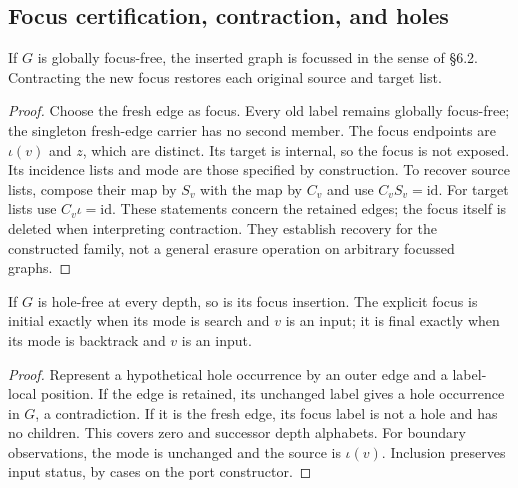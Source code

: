 \subsection{Focus certification, contraction, and holes}
\begin{theorem}
If $G$ is globally focus-free, the inserted graph is focussed in the sense of
\S6.2. Contracting the new focus restores each original source and target list.
\end{theorem}
\begin{proof}
Choose the fresh edge as focus. Every old label remains globally focus-free;
the singleton fresh-edge carrier has no second member. The focus endpoints are
$\iota(v)$ and $z$, which are distinct. Its target is internal, so the focus is
not exposed. Its incidence lists and mode are those specified by construction.
To recover source lists, compose their map by $S_v$ with the map by $C_v$ and
use $C_vS_v=\mathrm{id}$. For target lists use $C_v\iota=\mathrm{id}$.
These statements concern the retained edges; the focus itself is deleted when
interpreting contraction. They establish recovery for the constructed family,
not a general erasure operation on arbitrary focussed graphs.
\end{proof}

\begin{lemma}
If $G$ is hole-free at every depth, so is its focus insertion. The explicit
focus is initial exactly when its mode is search and $v$ is an input; it is
final exactly when its mode is backtrack and $v$ is an input.
\end{lemma}
\begin{proof}
Represent a hypothetical hole occurrence by an outer edge and a label-local
position. If the edge is retained, its unchanged label gives a hole occurrence
in $G$, a contradiction. If it is the fresh edge, its focus label is not a hole
and has no children. This covers zero and successor depth alphabets.
For boundary observations, the mode is unchanged and the source is
$\iota(v)$. Inclusion preserves input status, by cases on the port constructor.
\end{proof}

